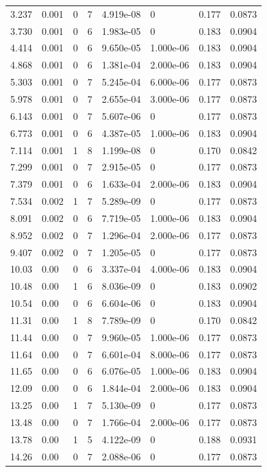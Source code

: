 \documentclass[preview]{standalone}
\begin{document}
{{\begin{tabular}{L{1.2cm}C{1.2cm} C{0.3cm}C{0.5cm} C{1.4cm}C{1.4cm} C{1.4cm}C{1.4cm}}
  3.237  &  0.001  & 0     &  7 &  4.919e-08  & 0  & 0.177 &  0.0873   \\ 
  3.730  &  0.001  & 0     &  6 &  1.983e-05  & 0  & 0.183 &  0.0904   \\ 
  4.414  &  0.001  & 0     &  6 &  9.650e-05  & 1.000e-06  & 0.183 &  0.0904   \\ 
  4.868  &  0.001  & 0     &  6 &  1.381e-04  & 2.000e-06  & 0.183 &  0.0904   \\ 
  5.303  &  0.001  & 0     &  7 &  5.245e-04  & 6.000e-06  & 0.177 &  0.0873   \\ 
  5.978  &  0.001  & 0     &  7 &  2.655e-04  & 3.000e-06  & 0.177 &  0.0873   \\ 
  6.143  &  0.001  & 0     &  7 &  5.607e-06  & 0  & 0.177 &  0.0873   \\ 
  6.773  &  0.001  & 0     &  6 &  4.387e-05  & 1.000e-06  & 0.183 &  0.0904   \\ 
  7.114  &  0.001  & 1     &  8 &  1.199e-08  & 0  & 0.170 &  0.0842   \\ 
  7.299  &  0.001  & 0     &  7 &  2.915e-05  & 0  & 0.177 &  0.0873   \\ 
  7.379  &  0.001  & 0     &  6 &  1.633e-04  & 2.000e-06  & 0.183 &  0.0904   \\ 
  7.534  &  0.002  & 1     &  7 &  5.289e-09  & 0  & 0.177 &  0.0873   \\ 
  8.091  &  0.002  & 0     &  6 &  7.719e-05  & 1.000e-06  & 0.183 &  0.0904   \\ 
  8.952  &  0.002  & 0     &  7 &  1.296e-04  & 2.000e-06  & 0.177 &  0.0873   \\ 
  9.407  &  0.002  & 0     &  7 &  1.205e-05  & 0  & 0.177 &  0.0873   \\ 
  10.03  &  0.00  & 0     &  6 &  3.337e-04  & 4.000e-06  & 0.183 &  0.0904   \\ 
  10.48  &  0.00  & 1     &  6 &  8.036e-09  & 0  & 0.183 &  0.0902   \\ 
  10.54  &  0.00  & 0     &  6 &  6.604e-06  & 0  & 0.183 &  0.0904   \\ 
  11.31  &  0.00  & 1     &  8 &  7.789e-09  & 0  & 0.170 &  0.0842   \\ 
  11.44  &  0.00  & 0     &  7 &  9.960e-05  & 1.000e-06  & 0.177 &  0.0873   \\ 
  11.64  &  0.00  & 0     &  7 &  6.601e-04  & 8.000e-06  & 0.177 &  0.0873   \\ 
  11.65  &  0.00  & 0     &  6 &  6.076e-05  & 1.000e-06  & 0.183 &  0.0904   \\ 
  12.09  &  0.00  & 0     &  6 &  1.844e-04  & 2.000e-06  & 0.183 &  0.0904   \\ 
  13.25  &  0.00  & 1     &  7 &  5.130e-09  & 0  & 0.177 &  0.0873   \\ 
  13.48  &  0.00  & 0     &  7 &  1.766e-04  & 2.000e-06  & 0.177 &  0.0873   \\ 
  13.78  &  0.00  & 1     &  5 &  4.122e-09  & 0  & 0.188 &  0.0931   \\ 
  14.26  &  0.00  & 0     &  7 &  2.088e-06  & 0  & 0.177 &  0.0873   \\ 
\hline 
\end{tabular} 

}}
\end{document}

